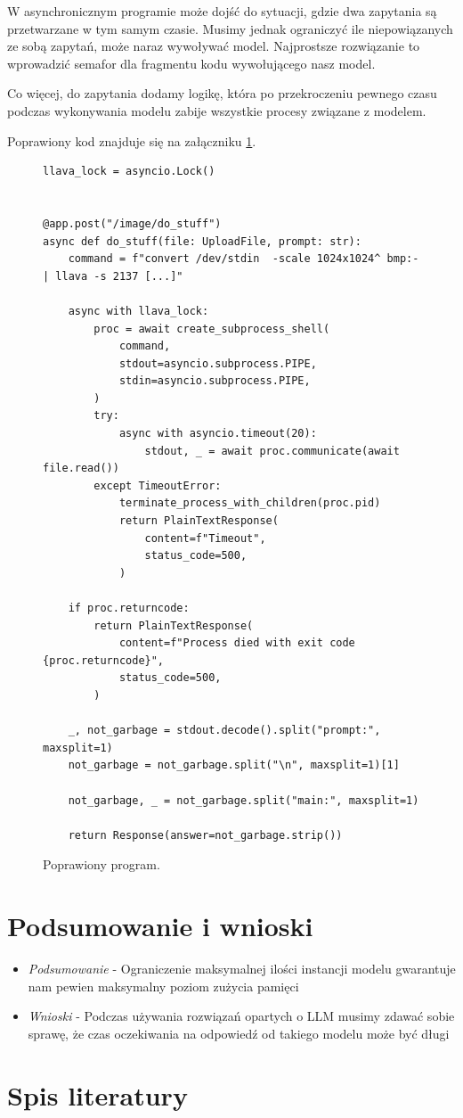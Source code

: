 \documentclass[12pt,a4paper]{article}
\begin{document}
W asynchronicznym programie może dojść do sytuacji, gdzie dwa zapytania są
przetwarzane w tym samym czasie. Musimy jednak ograniczyć ile niepowiązanych ze
sobą zapytań, może naraz wywoływać model. Najprostsze rozwiązanie to wprowadzić
semafor dla fragmentu kodu wywołującego nasz model.

Co więcej, do zapytania dodamy logikę, która po przekroczeniu pewnego czasu
podczas wykonywania modelu zabije wszystkie procesy związane z modelem.

Poprawiony kod znajduje się na załączniku \ref{poprawiony}.

\begin{figure}[p]
\begin{verbatim}
llava_lock = asyncio.Lock()


@app.post("/image/do_stuff")
async def do_stuff(file: UploadFile, prompt: str):
    command = f"convert /dev/stdin  -scale 1024x1024^ bmp:- | llava -s 2137 [...]"

    async with llava_lock:
        proc = await create_subprocess_shell(
            command,
            stdout=asyncio.subprocess.PIPE,
            stdin=asyncio.subprocess.PIPE,
        )
        try:
            async with asyncio.timeout(20):
                stdout, _ = await proc.communicate(await file.read())
        except TimeoutError:
            terminate_process_with_children(proc.pid)
            return PlainTextResponse(
                content=f"Timeout",
                status_code=500,
            )

    if proc.returncode:
        return PlainTextResponse(
            content=f"Process died with exit code {proc.returncode}",
            status_code=500,
        )

    _, not_garbage = stdout.decode().split("prompt:", maxsplit=1)
    not_garbage = not_garbage.split("\n", maxsplit=1)[1]

    not_garbage, _ = not_garbage.split("main:", maxsplit=1)

    return Response(answer=not_garbage.strip())
\end{verbatim}
  \caption{Poprawiony program.}\label{poprawiony}
\end{figure}
\newpage

\section{Podsumowanie i wnioski}

\begin{itemize}
  \item \textit{Podsumowanie} - Ograniczenie maksymalnej ilości instancji modelu
    gwarantuje nam pewien maksymalny poziom zużycia pamięci
  \item \textit{Wnioski} - Podczas używania rozwiązań opartych o LLM musimy
    zdawać sobie sprawę, że czas oczekiwania na odpowiedź od takiego modelu może
    być długi
\end{itemize}

\newpage
\section{Spis literatury}

\printbibliography[heading=none] 
\end{document}
